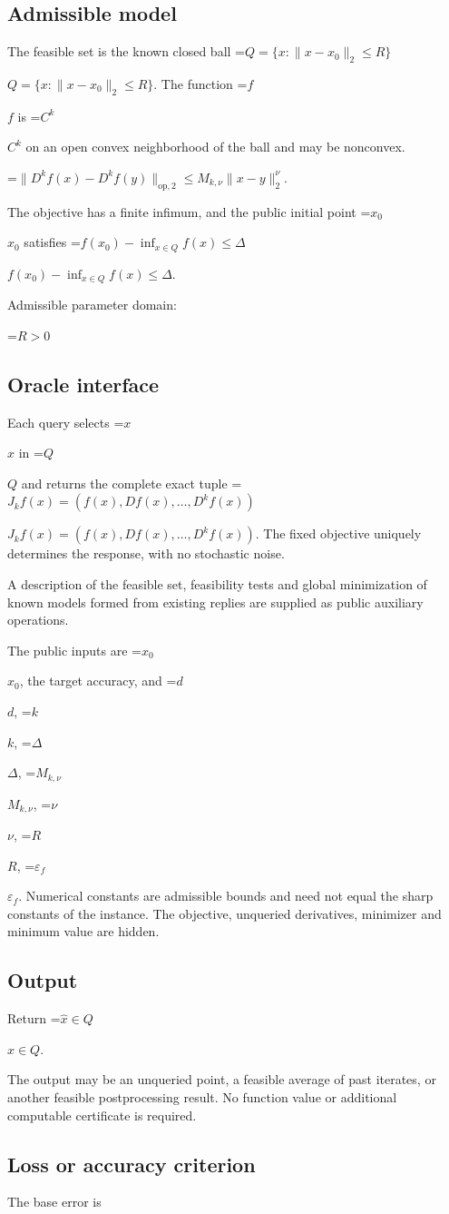 \documentclass[10pt,a4paper]{article}
\newcommand{\AtlasMath}[1]{\par\begingroup\centering\setbox0=\hbox{$\displaystyle #1$}\ifdim\wd0>1.4\linewidth\typeout{ATLAS WIDE FORMULA: \the\wd0}\fi\ifdim\wd0>\linewidth\resizebox{\linewidth}{!}{\box0}\else\box0\fi\par\endgroup}
\newcommand{\AtlasInlineMath}[1]{\begingroup\setbox0=\hbox{$#1$}\ifdim\wd0>.4\linewidth\endgroup\AtlasMath{#1}\else\endgroup$#1$\fi}
\begin{document}
\subsection{Admissible model}
The feasible set is the known closed ball \AtlasInlineMath{Q=\{x:\|x-x_0\|_2\le R\}}. The function \AtlasInlineMath{f} is \AtlasInlineMath{C^k} on an open convex neighborhood of the ball and may be nonconvex.


\AtlasMath{\|D^{k}f(x)-D^{k}f(y)\|_{\mathrm{op},2}\le M_{k,\nu}\|x-y\|_{2}^{\nu}.}


The objective has a finite infimum, and the public initial point \AtlasInlineMath{x_0} satisfies \AtlasInlineMath{f(x_0)-\inf_{x\in Q}f(x)\le\Delta}.

Admissible parameter domain:


\AtlasMath{R>0}


\subsection{Oracle interface}
Each query selects \AtlasInlineMath{x} in \AtlasInlineMath{Q} and returns the complete exact tuple \AtlasInlineMath{J_{k}f(x)=(f(x),Df(x),\ldots,D^{k}f(x))}. The fixed objective uniquely determines the response, with no stochastic noise.

A description of the feasible set, feasibility tests and global minimization of known models formed from existing replies are supplied as public auxiliary operations.

The public inputs are \AtlasInlineMath{x_0}, the target accuracy, and \AtlasInlineMath{d}, \AtlasInlineMath{k}, \AtlasInlineMath{\Delta}, \AtlasInlineMath{M_{k,\nu}}, \AtlasInlineMath{\nu}, \AtlasInlineMath{R}, \AtlasInlineMath{\varepsilon_f}. Numerical constants are admissible bounds and need not equal the sharp constants of the instance. The objective, unqueried derivatives, minimizer and minimum value are hidden.

\subsection{Output}
Return \AtlasInlineMath{\widehat{x}\in Q}.

The output may be an unqueried point, a feasible average of past iterates, or another feasible postprocessing result. No function value or additional computable certificate is required.

\subsection{Loss or accuracy criterion}
The base error is
\end{document}
